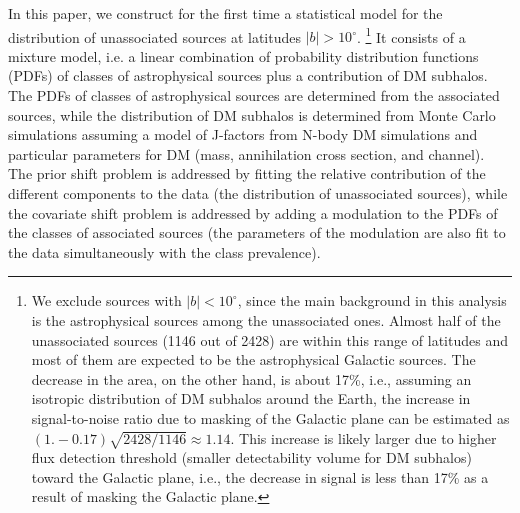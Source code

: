 In this paper, we construct for the first time a statistical model for the distribution of unassociated sources at latitudes $|b| > 10^\circ$.%
\footnote{We exclude sources with $|b| < 10^\circ$, since the main background in this analysis is the astrophysical sources among the unassociated ones. Almost half of the unassociated sources (1146 out of 2428) are within this range of latitudes and most of them are expected to be the astrophysical Galactic sources. The decrease in the area, on the other hand, is about 17\%, i.e., assuming an isotropic distribution of DM subhalos around the Earth, the increase in signal-to-noise ratio due to masking of the Galactic plane can be estimated as $ (1. - 0.17) \sqrt{2428/1146} \approx 1.14$.
This increase is likely larger due to higher flux detection threshold (smaller detectability volume for DM subhalos) toward the Galactic plane, i.e., the decrease in signal is less than 17\% as a result of masking the Galactic plane.
}
It consists of a mixture model, i.e. a linear combination of probability distribution functions (PDFs)
of classes of astrophysical sources plus a contribution of DM subhalos.
The PDFs of classes of astrophysical sources are determined from the associated sources, while the distribution of DM subhalos is determined from Monte Carlo simulations assuming a model of J-factors from N-body DM simulations and particular parameters for DM (mass, annihilation cross section, and channel).
The prior shift problem is addressed by fitting the relative contribution of the different components to the data (the distribution of unassociated sources), while the covariate shift problem is addressed by adding a modulation to the PDFs of the classes of associated sources (the parameters of the modulation are also fit to the data simultaneously with the class prevalence).

